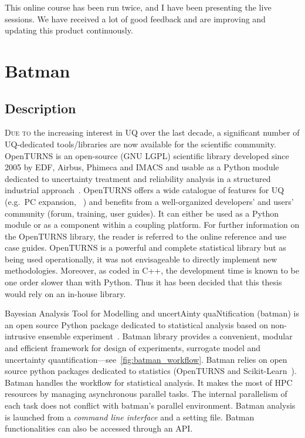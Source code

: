 This online course has been run twice, and I have been presenting the live sessions. We have received a lot of good feedback and are improving and updating this product continuously.


\chapter{Batman}\label{chap:batman}

\section{Description}

\lettrine{D}{ue to} the increasing interest in UQ over the last decade, a significant number of UQ-dedicated tools/libraries are now available for the scientific community. OpenTURNS is an open-source (GNU LGPL) scientific library developed since 2005 by EDF, Airbus, Phimeca and IMACS and usable as a Python module dedicated to uncertainty treatment and reliability analysis in a structured industrial approach~\citep{Baudin2015}. OpenTURNS offers a wide catalogue of features for UQ (e.g.~PC expansion, \citeauthor{dutka2009}~\citeyear{dutka2009}) and benefits from a well-organized developers' and users' community (forum, training, user guides). It can either be used as a Python module or as a component within a coupling platform. For further information on the OpenTURNS library, the reader is referred to the online reference and use case guides. OpenTURNS is a powerful and complete statistical library but as being used operationally, it was not envisageable to directly implement new methodologies. Moreover, as coded in C++, the development time is known to be one order slower than with Python. Thus it has been decided that this thesis would rely on an in-house library.

Bayesian Analysis Tool for Modelling and uncertAinty quaNtification (batman) is an open source Python package dedicated to statistical analysis based on non-intrusive ensemble experiment~\cite{Roy2018b}. Batman library provides a convenient, modular and efficient framework for design of experiments, surrogate model and uncertainty quantification---see~\cref{fig:batman_workflow}. Batman relies on open source python packages dedicated to statistics (OpenTURNS and Scikit-Learn~\citep{pedregosa2011}). Batman handles the workflow for statistical analysis. It makes the most of HPC resources by managing asynchronous parallel tasks. The internal parallelism of each task does not conflict with batman's parallel environment. Batman analysis is launched from a \emph{command line interface} and a setting file. Batman functionalities can also be accessed through an API.

